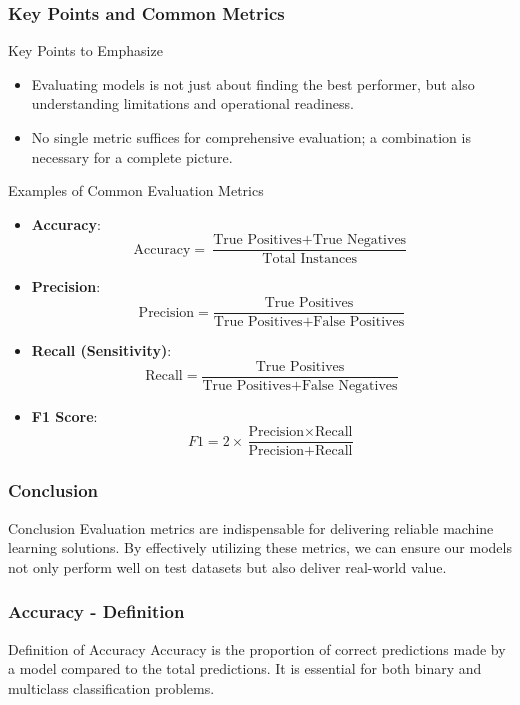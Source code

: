 \documentclass[aspectratio=169]{beamer}
\begin{document}
\begin{frame}[fragile]
    \frametitle{Key Points and Common Metrics}
    \begin{block}{Key Points to Emphasize}
        \begin{itemize}
            \item Evaluating models is not just about finding the best performer, but also understanding limitations and operational readiness.
            \item No single metric suffices for comprehensive evaluation; a combination is necessary for a complete picture.
        \end{itemize}
    \end{block}

    \begin{block}{Examples of Common Evaluation Metrics}
        \begin{itemize}
            \item \textbf{Accuracy}: 
            \[
            \text{Accuracy} = \frac{\text{True Positives} + \text{True Negatives}}{\text{Total Instances}}
            \]
            \item \textbf{Precision}:
            \[
            \text{Precision} = \frac{\text{True Positives}}{\text{True Positives} + \text{False Positives}}
            \]
            \item \textbf{Recall (Sensitivity)}:
            \[
            \text{Recall} = \frac{\text{True Positives}}{\text{True Positives} + \text{False Negatives}}
            \]
            \item \textbf{F1 Score}:
            \[
            F1 = 2 \times \frac{\text{Precision} \times \text{Recall}}{\text{Precision} + \text{Recall}}
            \]
        \end{itemize}
    \end{block}
\end{frame}

\begin{frame}[fragile]
    \frametitle{Conclusion}
    \begin{block}{Conclusion}
        Evaluation metrics are indispensable for delivering reliable machine learning solutions. By effectively utilizing these metrics, we can ensure our models not only perform well on test datasets but also deliver real-world value.
    \end{block}
\end{frame}

\begin{frame}[fragile]
    \frametitle{Accuracy - Definition}
    \begin{block}{Definition of Accuracy}
        Accuracy is the proportion of correct predictions made by a model compared to the total predictions. It is essential for both binary and multiclass classification problems.
    \end{block}
\end{frame}
\end{document}
